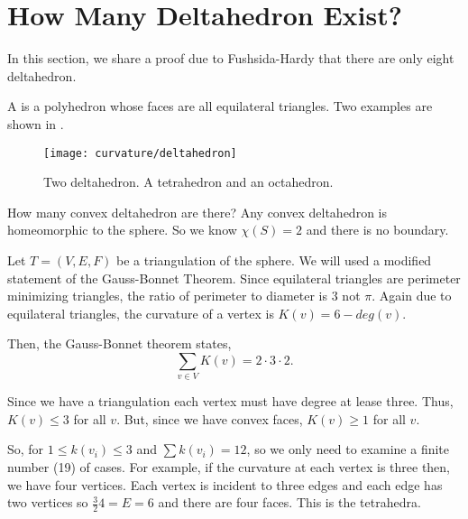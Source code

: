 \section{How Many Deltahedron Exist?}
\label{sec:deltahedron}

In this section, we share a proof due to
Fushsida-Hardy \cite{deltahedron} that there are
only eight deltahedron.

A  is a polyhedron whose
faces are all equilateral triangles. Two examples are shown
in .


\begin{figure}[htb]
\centering
\texttt{[image: curvature/deltahedron]}
\caption{Two deltahedron. A tetrahedron and an octahedron.}
\label{fig:deltahedron}
\end{figure}

How many convex deltahedron are there?
Any convex deltahedron is homeomorphic to the sphere.
So we know $\chi(S)=2$ and there is no boundary.

Let $T=(V,E,F)$  be a triangulation of the sphere.
We will used a modified statement of the Gauss-Bonnet Theorem.
Since equilateral triangles are perimeter minimizing triangles,
the ratio of perimeter to diameter is $3$ not $\pi$.
Again due to equilateral triangles, the curvature of a vertex
is $K(v)=6-deg(v).$

Then, the Gauss-Bonnet theorem
states,
$$\sum_{v\in V}K(v)=2\cdot  3\cdot 2.$$

Since we have a triangulation each
vertex must have degree at lease three.
Thus, $K(v)\leq 3$ for all $v$. But, since we have
convex faces, $K(v)\geq 1$ for all $v$.

So, for $1\leq k(v_i)\leq 3$ and  $\sum k(v_i)=12$,
so we only need to examine a finite number (19) of cases.
For example, if the curvature at each vertex is three then,
we have four vertices. Each vertex is incident to three edges
and each edge has two vertices so $\frac{3}{2}4=E=6$ and
there are four faces. This is the tetrahedra.




